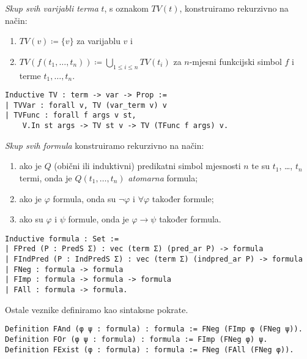 \begin{definition}
  \textit{Skup svih varijabli terma} \(t\), s oznakom \(\mathit{TV}(t)\), konstruiramo rekurzivno na način:
  \begin{enumerate}
  \item \( \mathit{TV}(v) \coloneq \{ v \} \) za varijablu \(v\) i
  \item \( \mathit{TV}(f(t_{1}, \ldots, t_{n})) \coloneq \bigcup_{1 \le i \le n} \mathit{TV}(t_{i}) \) za \(n\)-mjesni funkcijski simbol \(f\) i terme \(t_{1}, \ldots, t_{n}\).
  \end{enumerate}
\begin{verbatim}
Inductive TV : term -> var -> Prop :=
| TVVar : forall v, TV (var_term v) v
| TVFunc : forall f args v st,
    V.In st args -> TV st v -> TV (TFunc f args) v.
\end{verbatim}
\end{definition}

\begin{definition}\label{def:formula}
  \textit{Skup svih formula} konstruiramo rekurzivno na način:
  \begin{enumerate}
  \item ako je \(Q\) (obični ili induktivni) predikatni simbol mjesnosti \(n\) te su \(t_{1}\), \ldots, \(t_{n}\) termi,
    onda je \(Q(t_{1}, \ldots, t_{n})\) \textit{atomarna} formula;
  \item ako je \(\varphi\) formula, onda su \(\neg\varphi\) i \(\forall\varphi\) također formule;
  \item ako su \(\varphi\) i \(\psi\) formule, onda je \(\varphi \rightarrow \psi\) također formula.
  \end{enumerate}
\begin{verbatim}
Inductive formula : Set :=
| FPred (P : PredS Σ) : vec (term Σ) (pred_ar P) -> formula 
| FIndPred (P : IndPredS Σ) : vec (term Σ) (indpred_ar P) -> formula 
| FNeg : formula -> formula 
| FImp : formula -> formula -> formula 
| FAll : formula -> formula.
\end{verbatim}
  \noindent Ostale veznike definiramo kao sintaksne pokrate.
\begin{verbatim}
Definition FAnd (φ ψ : formula) : formula := FNeg (FImp φ (FNeg ψ)).
Definition FOr (φ ψ : formula) : formula := FImp (FNeg φ) ψ.
Definition FExist (φ : formula) : formula := FNeg (FAll (FNeg φ)).
\end{verbatim}
\end{definition}

